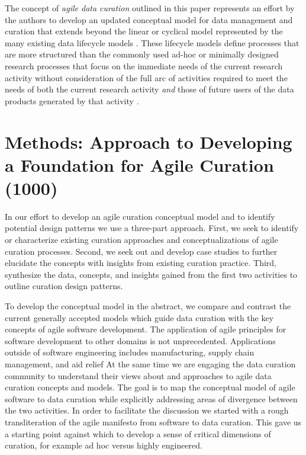 \documentclass[paper]{ijdc-v9}
\begin{document}
The concept of \emph{agile data curation} outlined in this paper
represents an effort by the authors to develop an updated conceptual
model for data management and curation that extends beyond the linear or
cyclical model represented by the many existing data lifecycle models
\autocites{ball_review_2012}{park_session_2016}{moller_lifecycle_2013}{working_group_on_information_systems_and_services_data_data_stewardship_interest_group_data_2011}.
These lifecycle models define processes that are more structured than
the commonly used ad-hoc or minimally designed research processes that
focus on the immediate needs of the current research activity without
consideration of the full arc of activities required to meet the needs
of both the current research activity \emph{and} those of future users
of the data products generated by that activity
\autocites{kervin_common_2013}{white_considering_2010}{tenopir_data_2011}{akers_disciplinary_2013}{kennan_research_2015}{vines_availability_2014}.

\section{Methods: Approach to Developing a Foundation for Agile Curation
(1000)}\label{methods-approach-to-developing-a-foundation-for-agile-curation-1000}

In our effort to develop an agile curation conceptual model and to
identify potential design patterns we use a three-part approach. First,
we seek to identify or characterize existing curation approaches and
conceptualizations of agile curation processes. Second, we seek out and
develop case studies to further elucidate the concepts with insights
from existing curation practice. Third, synthesize the data, concepts,
and insights gained from the first two activities to outline curation
design patterns.

To develop the conceptual model in the abstract, we compare and contrast
the current generally accepted models which guide data curation with the
key concepts of agile software development. The application of agile
principles for software development to other domains is not
unprecedented. Applications outside of software engineering includes
manufacturing, supply chain management, and aid relief
\autocites[e.g.][]{Conboy:2004:TCF:1029997.1030005}{cozzolino_agile_2012}
At the same time we are engaging the data curation community to
understand their views about and approaches to agile data curation
concepts and models. The goal is to map the conceptual model of agile
software to data curation while explicitly addressing areas of
divergence between the two activities. In order to facilitate the
discussion we started with a rough transliteration of the agile
manifesto from software to data curation. This gave us a starting point
against which to develop a sense of critical dimensions of curation, for
example ad hoc versus highly engineered.
\end{document}
